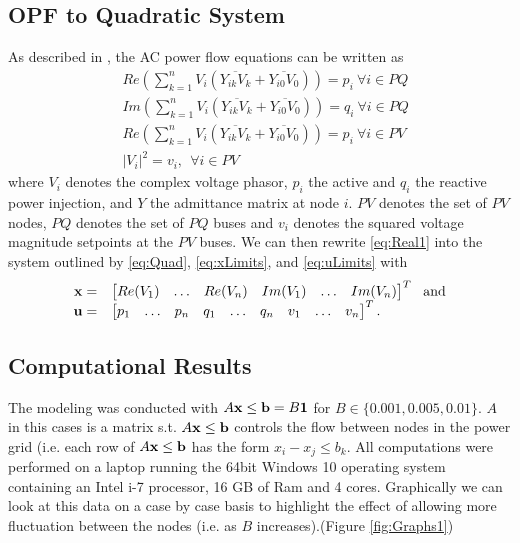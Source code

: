 \subsection{OPF to Quadratic System}
As described in \cite{DjTuritsyn}, the AC power flow equations can be written as 
\begin{align}\label{eq:Real1}
& Re\left(\sum\limits_{k=1}^n V_i\left(\overline{Y_{ik}V_k} + \overline{Y_{i0}V_0}\right)\right) = p_i \ \forall i\in PQ \\ \nonumber
& Im\left(\sum\limits_{k=1}^n V_i\left(\overline{Y_{ik}V_k} + \overline{Y_{i0}V_0}\right)\right) = q_i \ \forall i\in PQ \\ \nonumber
& Re\left(\sum\limits_{k=1}^n V_i\left(\overline{Y_{ik}V_k} + \overline{Y_{i0}V_0}\right)\right) = p_i \ \forall i\in PV \\ \nonumber
& |V_i|^2 = v_i, \  \ \forall i \in PV 
\end{align}
%
where $V_i$ denotes the complex voltage phasor, $p_i$ the active and $q_i$ the reactive power injection, and $Y$ the admittance matrix at node $i$. $PV$ denotes the set of $PV$ nodes, $PQ$ denotes the set of $PQ$ buses and $v_i$ denotes the squared voltage magnitude setpoints at the $PV$ buses. We can then rewrite \ref{eq:Real1} into the system outlined by \ref{eq:Quad}, \ref{eq:xLimits}, and \ref{eq:uLimits} with 
\[
\begin{array}{rl}
\mathbf{x}= & \begin{bmatrix} Re(V_1) & \dots & Re(V_n) & Im(V_1) & \dots  &  Im(V_n) \end{bmatrix}^T ~~\mbox{and} \\
\mathbf{u}=& \begin{bmatrix} p_1 &  \dots &  p_n &  q_1 &  \dots &  q_n &  v_1 &  \dots &  v_n \end{bmatrix}^T.
\end{array}
\]



\subsection{Computational Results}


The modeling was conducted with $A\mathbf{x} \leq \mathbf{b} = B \mathbf{1}$ for $B\in\{0.001, 0.005,0.01\}$.
$A$ in this cases is a matrix s.t. $A\mathbf{x} \leq \mathbf{b}$ controls the flow between nodes in the power grid (i.e. each row of $A\mathbf{x} \leq \mathbf{b}$ has the form $x_i-x_j\leq b_k$. 
All computations were performed on a laptop running the 64bit Windows 10 operating system containing an Intel i-7 processor, 16 GB of Ram and 4 cores. 
Graphically we can look at this data on a case by case basis to highlight the effect of allowing more fluctuation between the nodes (i.e. as $B$ increases).(Figure \ref{fig:Graphs1}) 

